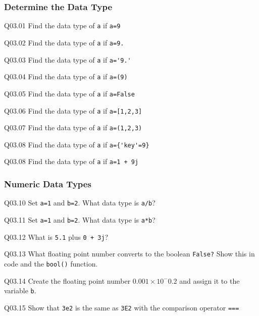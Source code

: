 \documentclass{book}
\newenvironment{problems}{}{}  %
\begin{document}
    
        \begin{problems}
        \subsubsection{Determine the Data Type}\label{determine-the-data-type}

Q03.01 Find the data type of \lstinline!a! if \lstinline!a=9!

Q03.02 Find the data type of \lstinline!a! if \lstinline!a=9.!

Q03.03 Find the data type of \lstinline!a! if \lstinline!a='9.'!

Q03.04 Find the data type of \lstinline!a! if \lstinline!a=(9)!

Q03.05 Find the data type of \lstinline!a! if \lstinline!a=False!

Q03.06 Find the data type of \lstinline!a! if \lstinline!a=[1,2,3]!

Q03.07 Find the data type of \lstinline!a! if \lstinline!a=(1,2,3)!

Q03.08 Find the data type of \lstinline!a! if \lstinline!a={'key'=9}!

Q03.08 Find the data type of \lstinline!a! if \lstinline!a=1 + 9j!
        \end{problems}

    




    
        \subsubsection{Numeric Data Types}\label{numeric-data-types}

Q03.10 Set \lstinline!a=1! and \lstinline!b=2!. What data type is
\lstinline!a/b!?

Q03.11 Set \lstinline!a=1! and \lstinline!b=2!. What data type is
\lstinline!a*b!?

Q03.12 What is \lstinline!5.1! plus \lstinline!0 + 3j!?

Q03.13 What floating point number converts to the boolean
\lstinline!False?! Show this in code and the \lstinline!bool()!
function.

Q03.14 Create the floating point number \(0.001 \times 10^-0.2\) and
assign it to the variable \lstinline!b!.

Q03.15 Show that \lstinline!3e2! is the same as \lstinline!3E2! with the
comparison operator \lstinline!===!
    
\end{document}
